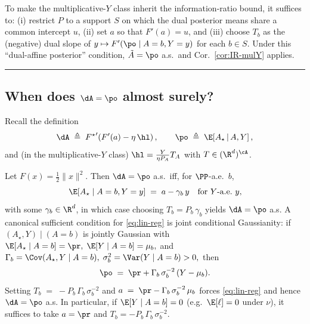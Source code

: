 \begin{remark}
    To make the multiplicative-$Y$ class inherit the information-ratio bound, it suffices to:
    (i) restrict $P$ to a support $S$ on which the dual posterior means share a common intercept $u$,
    (ii) set $a$ so that $F'(a)=u$, and (iii) choose $T_b$ as the (negative) dual slope
    of $y\mapsto F'(\po\mid A=b,Y=y)$ for each $b\in S$. Under this “dual-affine posterior”
    condition, $\tilde{A}=\po$ a.s.\ and Cor.~\ref{cor:IR-mulY} applies.
\end{remark}

\hrule

\subsection*{When does \texorpdfstring{$\dA=\po$}{A\_tilde=po} almost surely?}

Recall the definition
\[
    \dA \;\triangleq\; {F^\star}'\!\left(F'(a)-\eta\,\hl\right),
    \qquad
    \po \;\triangleq\; \E\!\left[A_\star \,\middle|\, A, Y\right],
\]
and (in the multiplicative-$Y$ class) $\hl=\frac{Y}{\eta P_A}T_A$ with $T\in(\R^d)^{\cA}$.

\begin{corollary}
    \label{cor:quad-linear}
    Let $F(x)=\tfrac12\|x\|^2$. Then $\dA=\po$ a.s.\ iff, for $\PP$-a.e.\ $b$,
    \begin{equation}
        \label{eq:lin-reg}
        \E[A_\star\mid A=b,Y=y] \;=\; a - \gamma_b\,y
        \quad\text{for $Y$-a.e.\ $y$,}
    \end{equation}
    with some $\gamma_b\in\R^{d}$, in which case choosing $T_b=P_b\,\gamma_b$ yields $\dA=\po$ a.s.
    A canonical sufficient condition for \eqref{eq:lin-reg} is joint conditional Gaussianity:
    if $(A_\star,Y)\mid(A=b)$ is jointly Gaussian with
    \(
    \E[A_\star\mid A=b]=\pr,\;
    \E[Y\mid A=b]=\mu_b,
    \)
    and
    \(
    \Gamma_b=\Cov(A_\star,Y\mid A=b),\;
    \sigma_b^2=\Var(Y\mid A=b)>0,
    \)
    then
    \[
        \po \;=\; \pr + \Gamma_b\,\sigma_b^{-2}\,(Y-\mu_b).
    \]
    Setting
    \(
    T_b \;=\; -P_b\,\Gamma_b\,\sigma_b^{-2}
    \)
    and
    \(
    a \;=\; \pr - \Gamma_b\,\sigma_b^{-2}\,\mu_b
    \)
    forces \eqref{eq:lin-reg} and hence $\dA=\po$ a.s.
    In particular, if $\E[Y\mid A=b]=0$ (e.g.\ $\E[\ell]=0$ under $\nu$), it suffices to take $a=\pr$ and $T_b=-P_b\,\Gamma_b\,\sigma_b^{-2}$.
\end{corollary}

